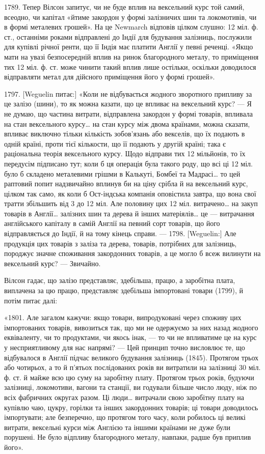 1789. Тепер Вілсон запитує, чи не буде вплив на вексельний курс той
самий, всеодно, чи капітал «йтиме закордон у формі залізничих шин та локомотивів,
чи в формі металевих грошей». На це Newmarch відповів цілком слушно:
12 міл. ф. ст., останніми роками відправлені до Індії для будування залізниць,
послужили для купівлі річної ренти, що її Індія має платити Англії у певні
реченці. «Якщо мати на увазі безпосередній вплив на ринок благородного металу,
то приміщення тих 12 міл. ф. ст. може чинити такий вплив лише остільки,
оскільки доводилося відправляти метал для дійсного приміщення його у формі
грошей».

1797. [Weguelin питає:] «Коли не відбувається жодного зворотного припливу
за це залізо (шини), то як можна казати, що це впливає на вексельний курс? —
Я не думаю, що частина витрати, відправлена закордон у формі товарів, впливала
на стан вексельного курсу\dots{} на стан курсу між двома країнами, можна
сказати, впливає виключно тільки кількість зобов’язань або векселів, що їх
подають в одній країні, проти тієї кількости, що її подають у другій країні; така
є раціональна теорія вексельного курсу. Щодо відправи тих 12 мільйонів, то
їх передусім підписано тут; коли б ця операція була такого роду, що всі ці
12 міл. було б складено металевими грішми в Калькуті, Бомбеї та Мадрасі\dots{}
то цей раптовий попит надзвичайно вплинув би на ціну срібла й на вексельний
курс, цілком так само, як коли б Ост-індська компанія оповістила завтра, що
вона свої тратти збільшить від 3 до 12 міл. Але половину цих 12 міл. витрачено\dots{}
на закуп товарів в Англії\dots{} залізних шин та дерева й інших матеріялів\dots{}
це — витрачання англійського капіталу в самій Англії на певний сорт
товарів, що його відправляється до Індії, й на тому кінець справи. — 1798.
[Weguelin:] Але продукція цих товарів з заліза та дерева, товарів, потрібних для
залізниць, породжує значне споживання закордонних товарів, а це могло б всеж
вилинути на вексельний курс? — Звичайно.

Вілсон гадає, що залізо представляє, здебільша, працю, а заробітна плата,
виплачена за цю працю, представляє здебільша імпортовані товари (1799), й
потім питає далі:

«1801. Але загалом кажучи: якщо товари, випродуковані через споживу
цих імпортованих товарів, вивозиться так, що ми не одержуємо за них назад
жодного еквіваленту, чи то продуктами, чи якось інак, — то чи не впливатиме
це на курс у несприятливому для нас напрямі? — Цей принцип точно висловлює те,
що відбувалося в Англії підчас великого будування залізниць (1845). Протягом
трьох або чотирьох, а то й п’ятьох послідованих років ви витратили на залізниці
30 міл. ф. ст. й майже всю цю суму на заробітну плату. Протягом трьох років,
будуючи залізниці, локомотиви, вагони та станції, ви годували більше число
люду, ніж по всіх фабричних округах разом. Ці люди\dots{} витрачали свою заробітну
плату на купівлю чаю, цукру, горілки та інших закордонних товарів; ці
товари доводилось імпортувати; але безперечно, що протягом того часу, коли робилось
ці великі витрати, вексельні курси між Англією та іншими країнами не
дуже були порушені. Не було відпливу благородного металу, навпаки, радше був
приплив його».

